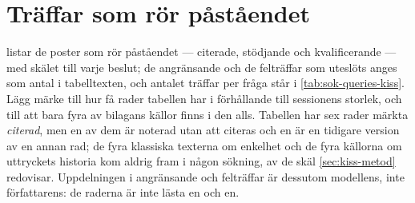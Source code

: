 \section{Träffar som rör påståendet}
\label{sec:kiss-traffar}

 listar de poster som rör påståendet --- citerade,
stödjande och kvalificerande --- med skälet till varje beslut; de
angränsande och de felträffar som uteslöts anges som antal i tabelltexten,
och antalet träffar per fråga står i \cref{tab:sok-queries-kiss}.  Lägg
märke till hur få rader tabellen har i förhållande till sessionens
storlek, och till att bara fyra av bilagans källor finns i den alls.
Tabellen har sex rader märkta \emph{citerad}, men en av dem är noterad
utan att citeras och en är en tidigare version av en annan rad; de fyra
klassiska texterna om enkelhet och de fyra käll\-orna om uttryckets
historia kom aldrig fram i någon sökning, av de skäl
\cref{sec:kiss-metod} redovisar.  Uppdelningen i angränsande och
felträffar är dessutom modellens, inte författarens: de raderna är inte
lästa en och en.
